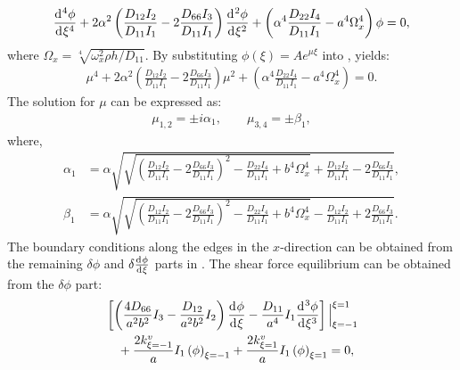 \documentclass[preprint,12pt]{elsarticle}
\newcommand{\id}{\mathrm{d}\mkern1mu}
\begin{document}
%
\begin{equation}\label{eq:ODEx}
		\frac{\id^4 \phi}{\id \xi^4}+ 2\alpha^2\left(\frac{D_{12}I_2}{D_{11}I_1}-2\frac{D_{66}I_3}{D_{11}I_1}\right)\frac{\id^2 \phi}{\id \xi^2}+\left(\alpha^4\frac{D_{22}I_4}{D_{11}I_1}-a^4\Omega_x^4\right)\phi=0,
\end{equation}
%
where \(\Omega_x = \sqrt[4]{\omega_x^2 \rho h / D_{11}}\).
By substituting \(\phi(\xi) = A e^{\mu \xi}\) into , yields:
%
\begin{equation}\label{eq:ODEx2}
	\begin{split}
		\mu^4 + 2\alpha^2\left(\frac{D_{12}I_2}{D_{11}I_1}-2\frac{D_{66}I_3}{D_{11}I_1}\right)\mu^2 + \left(\alpha^4\frac{D_{22}I_4}{D_{11}I_1}-a^4\Omega_x^4\right) = 0.
	\end{split}
\end{equation}
%
The solution for \(\mu\) can be expressed as:
%
\begin{equation}\label{eq:mu}
	\begin{split}
		\mu_{1,2} = \pm\textit{i} \alpha_1, \qquad \mu_{3,4} = \pm \beta_1,
	\end{split}
\end{equation}
%
where,
%
\begin{subequations}\label{eq:alphax}
	\begin{align}
		\alpha_1 &= \alpha \sqrt{\sqrt{\left(\frac{D_{12}I_2}{D_{11}I_1}-2\frac{D_{66}I_3}{D_{11}I_1}\right)^2 - \frac{D_{22}I_4}{D_{11}I_1} + b^4\Omega_x^4} + \frac{D_{12}I_2}{D_{11}I_1} - 2\frac{D_{66}I_3}{D_{11}I_1}},\label{eq:alphax1}\\
		\beta_1 &= \alpha \sqrt{\sqrt{\left(\frac{D_{12}I_2}{D_{11}I_1}-2\frac{D_{66}I_3}{D_{11}I_1}\right)^2 - \frac{D_{22}I_4}{D_{11}I_1} + b^4\Omega_x^4} - \frac{D_{12}I_2}{D_{11}I_1} + 2\frac{D_{66}I_3}{D_{11}I_1}}.\label{eq:alphax2}
	\end{align}
\end{subequations}
%
The boundary conditions along the edges in the \(x\)-direction can be obtained from the remaining \(\delta \phi\) and \(\delta \frac{\id \phi}{\id \xi}\) parts in . 
The shear force equilibrium can be obtained from the \(\delta \phi\) part:
%
\begin{equation}\label{eq:inertial_forcex}
	\begin{split}
		&\left[ \left( \frac{4D_{66}}{a^2b^2} I_3 - \frac{D_{12}}{a^2b^2} I_2 \right) \frac{\id \phi}{\id \xi} 
		- \frac{D_{11}}{a^4} I_1 \frac{\id^3 \phi}{\id \xi^3} \right] \Big|^{\xi=1}_{\xi=-1}\\
		&\quad+ \frac{2k^v_{\xi=-1}}{a} I_1 \left(\phi\right)_{\xi=-1}
		 + \frac{2k^v_{\xi=1}}{a} I_1 \left(\phi\right)_{\xi=1} = 0,
	\end{split}
\end{equation}
\end{document}
